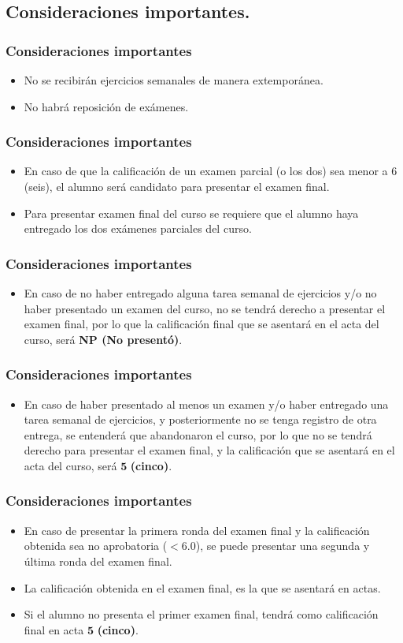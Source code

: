 \subsection{Consideraciones importantes.}
\begin{frame}
\frametitle{Consideraciones importantes}
\begin{itemize}
\setlength{\itemsep}{0mm}
\item No se recibirán ejercicios semanales de manera extemporánea.
\item No habrá reposición de exámenes.
\end{itemize}
\end{frame}
\begin{frame}
\frametitle{Consideraciones importantes}
\begin{itemize}
\setlength{\itemsep}{0mm}
\item En caso de que la calificación de un examen parcial (o los dos) sea menor a $6$ (seis), el alumno será candidato para presentar el examen final.
\item Para presentar examen final del curso se requiere que el alumno haya entregado los dos exámenes parciales del curso.
\end{itemize}
\end{frame}
\begin{frame}
\frametitle{Consideraciones importantes}
\begin{itemize}
\setlength{\itemsep}{0mm}
\item En caso de no haber entregado alguna tarea semanal de ejercicios y/o no haber presentado un examen del curso, no se tendrá derecho a presentar el examen final, por lo que la calificación final que se asentará en el acta del curso, será \textbf{NP (No presentó)}.
\end{itemize}
\end{frame}
\begin{frame}
\frametitle{Consideraciones importantes}
\begin{itemize}
\setlength{\itemsep}{0mm}
\item En caso de haber presentado al menos un examen y/o haber entregado una tarea semanal de ejercicios, y posteriormente no se tenga registro de otra entrega, se entenderá que abandonaron el curso, por lo que no se tendrá derecho para presentar el examen final, y la calificación que se asentará en el acta del curso, será $\mathbf{5}$ \textbf{(cinco)}.
\end{itemize}
\end{frame}
\begin{frame}
\frametitle{Consideraciones importantes}
\begin{itemize}
\setlength{\itemsep}{0mm}
\item En caso de presentar la primera ronda del examen final y la calificación obtenida sea no aprobatoria ($<6.0$), se puede presentar una segunda y última ronda del examen final.
\item La calificación obtenida en el examen final, es la que se asentará en actas.
\item Si el alumno no presenta el primer examen final, tendrá como calificación final en acta $\mathbf{5}$ \textbf{(cinco)}. 
\end{itemize}
\end{frame}
